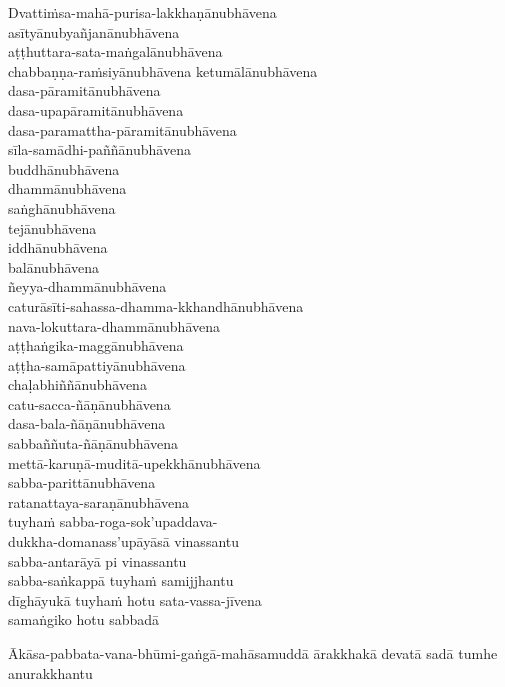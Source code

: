 Dvattiṁsa-mahā-purisa-lakkhaṇānubhāvena\\
asītyānubyañjanānubhāvena\\
aṭṭhuttara-sata-maṅgalānubhāvena\\
chabbaṇṇa-raṁsiyānubhāvena ketumālānubhāvena\\
dasa-pāramitānubhāvena\\
dasa-upapāramitānubhāvena\\
dasa-paramattha-pāramitānubhāvena\\
sīla-samādhi-paññānubhāvena\\
buddhānubhāvena\\
dhammānubhāvena\\
saṅghānubhāvena\\
tejānubhāvena\\
iddhānubhāvena\\
balānubhāvena\\
ñeyya-dhammānubhāvena\\
caturāsīti-sahassa-dhamma-kkhandhānubhāvena\\
nava-lokuttara-dhammānubhāvena\\
aṭṭhaṅgika-maggānubhāvena\\
aṭṭha-samāpattiyānubhāvena\\
chaḷabhiññānubhāvena\\
catu-sacca-ñāṇānubhāvena\\
dasa-bala-ñāṇānubhāvena\\
sabbaññuta-ñāṇānubhāvena\\
mettā-karuṇā-muditā-upekkhānubhāvena\\
sabba-parittānubhāvena\\
ratanattaya-saraṇānubhāvena\\
tuyhaṁ sabba-roga-sok'upaddava-\\ dukkha-domanass'upāyāsā vinassantu\\
sabba-antarāyā pi vinassantu\\
sabba-saṅkappā tuyhaṁ samijjhantu\\
dīghāyukā tuyhaṁ hotu sata-vassa-jīvena\\
samaṅgiko hotu sabbadā

Ākāsa-pabbata-vana-bhūmi-gaṅgā-mahāsamuddā ārakkhakā
devatā sadā tumhe anurakkhantu


\bigskip

